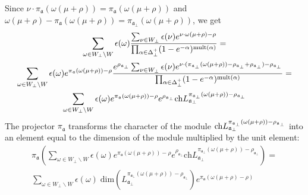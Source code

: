 \documentclass[a4paper,12pt]{article}
\theoremstyle{definition} \newtheorem{Def}{Definition}
\begin{document}
Since $\nu\cdot \pi_{\mathfrak{a}}(\omega(\mu+\rho))=\pi_{\mathfrak{a}}(\omega(\mu+\rho))$ and $\omega(\mu+\rho)-\pi_{\mathfrak{a}}(\omega(\mu+\rho))=\pi_{\mathfrak{a}_{\bot}}(\omega(\mu+\rho))$, we get
\begin{multline}
  \label{eq:14}
  \sum_{\omega\in W_{\bot}\backslash W} \epsilon(\omega) \frac{\sum_{\nu\in W_{\bot}}\epsilon(\nu) e^{\nu \cdot \omega(\mu+\rho)-\rho}}{\prod_{\alpha\in\Delta^{+}_{\bot}}(1-e^{-\alpha})^{\mathrm{mult}(\alpha)}} =\\
  \sum_{\omega\in W_{\bot}\backslash W} \epsilon(\omega) e^{\pi_{\mathfrak{a}}(\omega(\mu+\rho))-\rho} \frac{e^{\rho_{\mathfrak{a}_{\bot}} }\sum_{\nu\in W_{\bot}}\epsilon(\nu) e^{\nu \cdot (\pi_{\mathfrak{a}_{\bot}}(\omega(\mu+\rho))-\rho_{\mathfrak{a}_{\bot}}+\rho_{\mathfrak{a}_{\bot}})-\rho_{\mathfrak{a}_{\bot}}}}{\prod_{\alpha\in\Delta^{+}_{\bot}}(1-e^{-\alpha})^{\mathrm{mult}(\alpha)}}=\\
  \sum_{\omega\in W_{\bot}\backslash W} \epsilon(\omega) e^{\pi_{\mathfrak{a}}(\omega(\mu+\rho))-\rho}e^{\rho_{\mathfrak{a}_{\bot}}} {\rm ch} L^{\pi_{\mathfrak{a}_{\bot}}(\omega(\mu+\rho))-\rho_{\mathfrak{a}_{\bot}}}_{\mathfrak{a}_{\bot}}
\end{multline}
The projector $\pi_{\mathfrak{a}}$ transforms the character of the module ${\rm ch}L^{\pi_{\mathfrak{a}_{\bot}}(\omega(\mu+\rho))-\rho_{\mathfrak{a}_{\bot}}}_{\mathfrak{a}_{\bot}}$ into an element equal to the dimension of the module multiplied by the unit element:
  \begin{multline}
    \label{eq:15}
    \pi_{\mathfrak{a}}\left( \sum_{\omega\in W_{\bot}\backslash W} \epsilon(\omega) e^{\pi_{\mathfrak{a}}(\omega(\mu+\rho))-\rho}e^{\rho_{\mathfrak{a}_{\bot}}} \mathrm{ch} L^{\pi_{\mathfrak{a}_{\bot}}(\omega(\mu+\rho))-\rho_{\mathfrak{a}_{\bot}}}_{\mathfrak{a}_{\bot}}\right) = \\
    \sum_{\omega\in W_{\bot}\backslash W} \epsilon(\omega)\; \mathrm{dim}\left(L^{\pi_{\mathfrak{a}_{\bot}}(\omega(\mu+\rho))-\rho_{\mathfrak{a}_{\bot}}}_{\mathfrak{a}_{\bot}}\right) e^{\pi_{\mathfrak{a}}(\omega(\mu+\rho)-\rho)}
  \end{multline}
\end{document}
